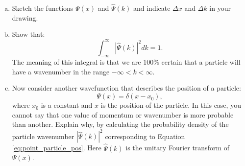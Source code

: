 \begin{enumerate}
\begin{enumerate}[a)]
          \item Sketch the functions $\Psi(x)$ and $\hat{\Psi}(k)$ and indicate 
                $\Delta x$ and $\Delta k$ in your drawing.

          \item Show that:
                \[ \int_{-\infty}^{\infty} |\hat{\Psi}(k)|^{2}dk=1. \]
                The meaning of this integral is that we are 100\% certain that a particle 
                will have a wavenumber in the range $-\infty<k<\infty$.

          \item Now consider another wavefunction that describes the position of a particle:
                \begin{equation}
                  \Psi(x) = \delta(x-x_0),
                  \label{eq:point_particle_pos}
                \end{equation}
                where $x_0$ is a constant and $x$ is the position of the particle. In
                this case, you cannot say that one value of momentum or wavenumber is
                more probable than another. Explain why, by calculating the
                probability density of the particle wavenumber $|\hat{\Psi}(k)|^2$
                corresponding to Equation \ref{eq:point_particle_pos}. Here
                $\hat{\Psi}(k)$ is the unitary Fourier transform of $\Psi(x)$.

        \end{enumerate}
\end{enumerate}
